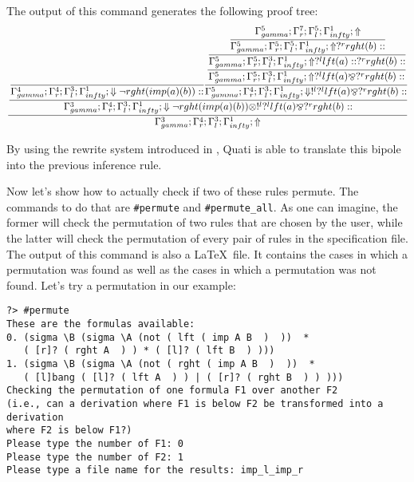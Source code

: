 \documentclass{llncs}
\begin{document}
The output of this command generates the following proof tree:
%
{\scriptsize\[\cfrac{\cfrac{\cfrac{}
{\Gamma_{ gamma}^{4} ; \Gamma_{r}^{4} ; \Gamma_{l}^{3} ; \Gamma_{ infty}^{1} ;  \Downarrow \neg rght (imp (a) (b) )  :: }\cfrac{\cfrac{\cfrac{\cfrac{\Gamma_{ gamma}^{5} ; \Gamma_{r}^{7} ; \Gamma_{l}^{5} ; \Gamma_{ infty}^{1} ;  \Uparrow }
{\Gamma_{ gamma}^{5} ; \Gamma_{r}^{5} ; \Gamma_{l}^{5} ; \Gamma_{ infty}^{1} ;  \Uparrow  ?^{r} rght (b)  :: }}
{\Gamma_{ gamma}^{5} ; \Gamma_{r}^{5} ; \Gamma_{l}^{3} ; \Gamma_{ infty}^{1} ;  \Uparrow  ?^{l} lft (a)  ::  ?^{r} rght (b)  :: }}
{\Gamma_{ gamma}^{5} ; \Gamma_{r}^{5} ; \Gamma_{l}^{3} ; \Gamma_{ infty}^{1} ;  \Uparrow  ?^{l} lft (a)  \bindnasrepma  ?^{r} rght (b)  :: }}
{\Gamma_{ gamma}^{5} ; \Gamma_{r}^{4} ; \Gamma_{l}^{3} ; \Gamma_{ infty}^{1} ;  \Downarrow  !^{l}  ?^{l} lft (a)  \bindnasrepma  ?^{r} rght (b)  :: }}
{\Gamma_{ gamma}^{3} ; \Gamma_{r}^{4} ; \Gamma_{l}^{3} ; \Gamma_{ infty}^{1} ;  \Downarrow \neg rght (imp (a) (b) )  \otimes  !^{l}  ?^{l} lft (a)  \bindnasrepma  ?^{r} rght (b)  :: }}
{\Gamma_{ gamma}^{3} ; \Gamma_{r}^{4} ; \Gamma_{l}^{3} ; \Gamma_{ infty}^{1} ; \Uparrow }\]}

By using the rewrite system introduced in \cite{nigam13iclp}, Quati is able to
translate this bipole into the previous inference rule.

Now let's show how to actually check if two of these rules permute. The commands
to do that are \texttt{\#permute} and \texttt{\#permute\_all}. As one can
imagine, the former will check the permutation of two rules that are chosen by
the user, while the latter will check the permutation of every pair of rules in
the specification file. The output of this command is also a \LaTeX\ file. It
contains the cases in which a permutation was found as well as the cases in
which a permutation was not found. Let's try a permutation in our example:
%
{\scriptsize
\begin{verbatim}
?> #permute
These are the formulas available: 
0. (sigma \B (sigma \A (not ( lft ( imp A B  )  ))  * 
   ( [r]? ( rght A  ) ) * ( [l]? ( lft B  ) )))
1. (sigma \B (sigma \A (not ( rght ( imp A B  )  ))  * 
   ( [l]bang ( [l]? ( lft A  ) ) | ( [r]? ( rght B  ) ) )))
Checking the permutation of one formula F1 over another F2 
(i.e., can a derivation where F1 is below F2 be transformed into a derivation 
where F2 is below F1?) 
Please type the number of F1: 0
Please type the number of F2: 1
Please type a file name for the results: imp_l_imp_r
\end{verbatim}
}
\end{document}
